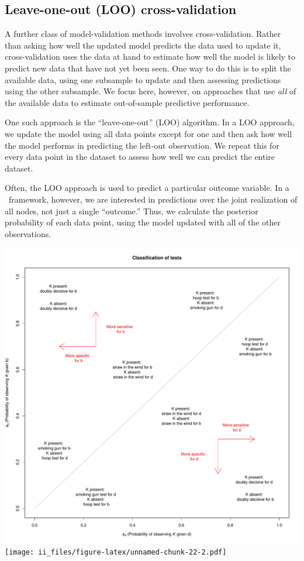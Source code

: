 \documentclass[
  12pt,
]{book}
\begin{document}
\hypertarget{leave-one-out-loo-cross-validation}{%
\subsection{Leave-one-out (LOO) cross-validation}\label{leave-one-out-loo-cross-validation}}

A further class of model-validation methods involves cross-validation. Rather than asking how well the updated model predicts the data used to update it, cross-validation uses the data at hand to estimate how well the model is likely to predict new data that have not yet been seen. One way to do this is to split the available data, using one subsample to update and then assessing predictions using the other subsample. We focus here, however, on approaches that use \emph{all} of the available data to estimate out-of-sample predictive performance.

One such approach is the ``leave-one-out'' (LOO) algorithm. In a LOO approach, we update the model using all data points except for one and then ask how well the model performs in predicting the left-out observation. We repeat this for every data point in the dataset to assess how well we can predict the entire dataset.

Often, the LOO approach is used to predict a particular outcome variable. In a \CausalQuery~framework, however, we are interested in predictions over the joint realization of all nodes, not just a single ``outcome.'' Thus, we calculate the posterior probability of each data point, using the model updated with all of the other observations.

\includegraphics{ii_files/figure-latex/unnamed-chunk-22-1.pdf} \texttt{[image: ii\_files/figure-latex/unnamed-chunk-22-2.pdf]}
\end{document}
